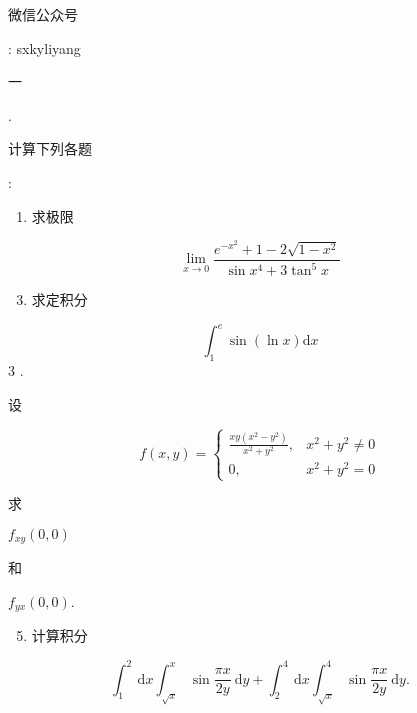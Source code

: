 \documentclass[10pt]{article}
\begin{document}
\begin{CJK}{UTF8}{mj}微信公众号\end{CJK}: sxkyliyang

\begin{CJK}{UTF8}{mj}一\end{CJK}. \begin{CJK}{UTF8}{mj}计算下列各题\end{CJK}:

\begin{enumerate}
  \item \begin{CJK}{UTF8}{mj}求极限\end{CJK}
\end{enumerate}
$$
\lim _{x \rightarrow 0} \frac{e^{-x^{2}}+1-2 \sqrt{1-x^{2}}}{\sin x^{4}+3 \tan ^{5} x}
$$

\begin{enumerate}
  \setcounter{enumi}{2}
  \item \begin{CJK}{UTF8}{mj}求定积分\end{CJK}
\end{enumerate}
$$
\int_{1}^{e} \sin (\ln x) \mathrm{d} x
$$
3 . \begin{CJK}{UTF8}{mj}设\end{CJK}
$$
f(x, y)= \begin{cases}\frac{x y\left(x^{2}-y^{2}\right)}{x^{2}+y^{2}}, & x^{2}+y^{2} \neq 0 \\ 0, & x^{2}+y^{2}=0\end{cases}
$$
\begin{CJK}{UTF8}{mj}求\end{CJK} $f_{x y}(0,0)$ \begin{CJK}{UTF8}{mj}和\end{CJK} $f_{y x}(0,0)$.

\begin{enumerate}
  \setcounter{enumi}{4}
  \item \begin{CJK}{UTF8}{mj}计算积分\end{CJK}
\end{enumerate}
$$
\int_{1}^{2} \mathrm{~d} x \int_{\sqrt{x}}^{x} \sin \frac{\pi x}{2 y} \mathrm{~d} y+\int_{2}^{4} \mathrm{~d} x \int_{\sqrt{x}}^{4} \sin \frac{\pi x}{2 y} \mathrm{~d} y .
$$
\end{document}
